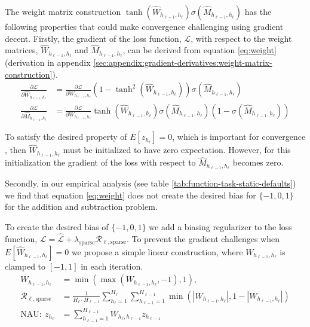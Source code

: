 The weight matrix construction $\tanh(\hat{W}_{h_{\ell-1},h_\ell}) \sigma(\hat{M}_{h_{\ell-1},h_\ell})$ has the following properties that could make convergence challenging using gradient decent. Firstly, the gradient of the loss function, $\mathcal{L}$, with respect to the weight matrices, $\hat{W}_{h_{\ell-1},h_\ell}$ and $\hat{M}_{h_{\ell-1},h_\ell}$, can be derived from equation \ref{eq:weight} (derivation in appendix \ref{sec:appendix:gradient-derivatives:weight-matrix-construction}).
\begin{equation}
\begin{aligned}
\frac{\partial \mathcal{L}}{\partial \hat{W}_{h_{\ell-1},h_\ell}} &= \frac{\partial \mathcal{L}}{\partial W_{h_{\ell-1},h_\ell}} (1 - \tanh^2(\hat{W}_{h_{\ell-1},h_\ell})) \sigma(\hat{M}_{h_{\ell-1},h_\ell}) \\
\frac{\partial \mathcal{L}}{\partial \hat{M}_{h_{\ell-1},h_\ell}} &= \frac{\partial \mathcal{L}}{\partial W_{h_{\ell-1},h_\ell}} \tanh(\hat{W}_{h_{\ell-1},h_\ell}) \sigma(\hat{M}_{h_{\ell-1},h_\ell}) (1 - \sigma(\hat{M}_{h_{\ell-1},h_\ell}))
\end{aligned}
\label{eq:nac-weight-gradient}
\end{equation}

To satisfy the desired property of $E[z_{h_\ell}]  = 0$, which is important for convergence \cite{glorot-initialization}, then  $\hat{W}_{h_{\ell-1},h_\ell}$ must be initialized to have zero expectation.
However, for this initialization the gradient of the loss with respect to  $\hat{M}_{h_{\ell-1},h_\ell}$ becomes zero.

Secondly, in our empirical analysis (see table \ref{tab:function-task-static-defaults}) we find that equation \ref{eq:weight} does not create the desired bias for $\{-1, 0, 1\}$ for the addition and subtraction problem.

To create the desired bias of $\{-1, 0, 1\}$ we add a biasing regularizer to the loss function, $\mathcal{L} = \hat{\mathcal{L}} + \lambda_{\mathrm{sparse}} \mathcal{R}_{\ell,\mathrm{sparse}}$. To prevent the gradient challenges when $E[\hat{W}_{h_{\ell-1},h_\ell}] = 0$ we propose a simple linear construction, where $W_{h_{\ell-1},h_\ell}$ is clamped to $[-1, 1]$ in each iteration.
\begin{align}
W_{h_{\ell-1},h_\ell} &= \min(\max(W_{h_{\ell-1},h_\ell}, -1), 1), \\
\mathcal{R}_{\ell,\mathrm{sparse}} &= \frac{1}{H_\ell \cdot H_{\ell-1}} \sum_{h_\ell=1}^{H_\ell} \sum_{h_{\ell-1}=1}^{H_{\ell-1}} \min\left(|W_{h_{\ell-1},h_\ell}|, 1 - \left|W_{h_{\ell-1},h_\ell}\right|\right) \\
\textrm{NAU}:\ z_{h_\ell} &= \sum_{h_{\ell-1}=1}^{H_{\ell-1}} W_{h_{\ell}, h_{\ell-1}} z_{h_{\ell-1}}
\end{align}

